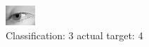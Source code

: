 \begin{figure}[h!]
\begin{center}
\includegraphics[width=0.60\columnwidth]{figures/ID2908_class_3_target_4.png}
\end{center}
\caption{ Classification: 3 actual target: 4}
\label{fig:ID2908_class_3_target_4}
\end{figure}
